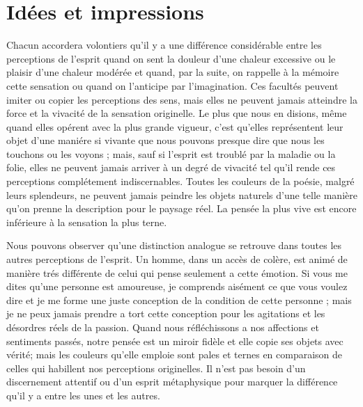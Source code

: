 
\section{Idées et impressions}
Chacun accordera volontiers qu’il y a une différence
considérable entre les perceptions de l'esprit quand on
sent la douleur d’une chaleur excessive ou le plaisir d’une
chaleur modérée et quand, par la suite, on rappelle à la
mémoire cette sensation ou quand on l’anticipe par l’imagination.
Ces facultés peuvent imiter ou copier les perceptions
des sens, mais elles ne peuvent jamais atteindre
la force et la vivacité de la sensation originelle. Le plus
que nous en disions, même quand elles opérent avec la
plus grande vigueur, c’est qu’elles représentent leur objet
d’une maniére si vivante que nous pouvons presque dire
que nous les touchons ou les voyons ; mais, sauf si l’esprit
est troublé par la maladie ou la folie, elles ne peuvent
jamais arriver à un degré de vivacité tel qu’il rende ces
perceptions complétement indiscernables. Toutes les
couleurs de la poésie, malgré leurs splendeurs, ne peuvent
jamais peindre les objets naturels d’une telle manière
qu’on prenne la description pour le paysage réel. La
pensée la plus vive est encore inférieure à la sensation la
plus terne.

Nous pouvons observer qu’une distinction analogue se
retrouve dans toutes les autres perceptions de l'esprit.
Un homme, dans un accès de colère, est animé de manière
trés différente de celui qui pense seulement a cette émotion.
Si vous me dites qu’une personne est amoureuse, je comprends
aisément ce que vous voulez dire et je me forme
une juste conception de la condition de cette personne ;
mais je ne peux jamais prendre a tort cette conception
pour les agitations et les désordres réels de la passion.
Quand nous réfléchissons a nos affections et sentiments
passés, notre pensée est un miroir fidèle et elle copie ses
objets avec vérité; mais les couleurs qu'elle emploie
sont pales et ternes en comparaison de celles qui habillent
nos perceptions originelles. Il n’est pas besoin d’un discernement
attentif ou d’un esprit métaphysique pour
marquer la différence qu’il y a entre les unes et les autres.

